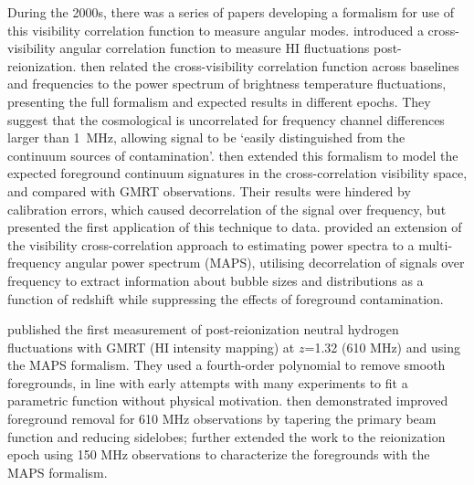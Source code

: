 During the 2000s, there was a series of papers developing a formalism for use of this visibility correlation function to measure angular modes.
\cite{bharadwaj01} introduced a cross-visibility angular correlation function to measure HI fluctuations post-reionization. 
\cite{bharadwaj05} then related the cross-visibility correlation function across baselines and frequencies to the power spectrum of brightness temperature fluctuations, presenting the full formalism and expected results in different epochs. They suggest that the cosmological is uncorrelated for frequency channel differences larger than 1~MHz, allowing signal to be `easily distinguished from the continuum sources of contamination'.
\cite{ali08} then extended this formalism to model the expected foreground continuum signatures in the cross-correlation visibility space, and compared with GMRT observations. Their results were hindered by calibration errors, which caused decorrelation of the signal over frequency, but presented the first application of this technique to data.
\cite{datta07} provided an extension of the visibility cross-correlation approach to estimating power spectra to a multi-frequency angular power spectrum (MAPS), utilising decorrelation of signals over frequency to extract information about bubble sizes and distributions as a function of redshift while suppressing the effects of foreground contamination.

\cite{ghosh11} published the first measurement of post-reionization neutral hydrogen fluctuations with GMRT (HI intensity mapping) at $z$=1.32 (610 MHz) and using the MAPS formalism. 
They used a fourth-order polynomial to remove smooth foregrounds, in line with early attempts with many experiments to fit a parametric function without physical motivation.
\cite{ghosh11a} then demonstrated improved foreground removal for 610 MHz observations by tapering the primary beam function and reducing sidelobes; 
\cite{ghosh12} further extended the work to the reionization epoch using 150 MHz observations to characterize the foregrounds with the MAPS formalism.

